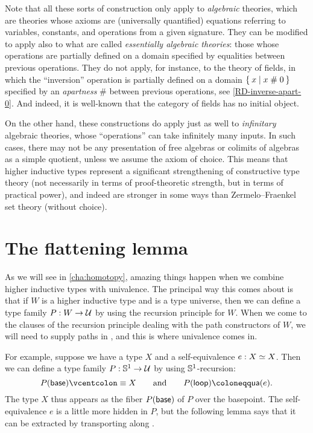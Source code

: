 \mentalpause

Note that all these sorts of construction only apply to \emph{algebraic} theories, which are theories whose axioms are (universally quantified) equations referring to variables, constants, and operations from a given signature.
They can be modified to apply also to what are called \emph{essentially algebraic theories}: those whose operations are partially defined on a domain specified by equalities between previous operations.
They do not apply, for instance, to the theory of fields, in which the ``inversion'' operation is partially defined on a domain $\Set{x | x \mathrel{\#} 0}$ specified by an \emph{apartness} $\#$ between previous operations, see \autoref{RD-inverse-apart-0}.
And indeed, it is well-known that the category of fields has no initial object.
%

On the other hand, these constructions do apply just as well to \emph{infinitary} algebraic theories, whose ``operations'' can take infinitely many inputs.
In such cases, there may not be any presentation of free algebras or colimits of algebras as a simple quotient, unless we assume the axiom of choice.
This means that higher inductive types represent a significant strengthening of constructive type theory (not necessarily in terms of proof-theoretic strength, but in terms of practical power), and indeed are stronger in some ways than Zermelo--Fraenkel set theory (without choice).


\section{The flattening lemma}
\label{sec:flattening}

As we will see in \autoref{cha:homotopy}, amazing things happen when we combine higher inductive types with univalence.
The principal way this comes about is that if $W$ is a higher inductive type and \UU is a type universe, then we can define a type family $P:W\to \mathcal{U}$ by using the recursion principle for $W$.
When we come to the clauses of the recursion principle dealing with the path constructors of $W$, we will need to supply paths in \UU, and this is where univalence comes in.

For example, suppose we have a type $X$ and a self-equivalence $e:X \simeq X$.
Then we can define a type family $P:\mathbb{S}^1 \to \mathcal{U}$ by using $\mathbb{S}^1$-recursion:
\begin{equation*}
  P(\base) \defeq X
  \qquad\text{and}\qquad
  \ap P\lloop \defid \ua(e).
\end{equation*}
The type $X$ thus appears as the fiber $P(\mathsf{base})$ of $P$ over the basepoint.
The self-equivalence $e$ is a little more hidden in $P$, but the following lemma says that it can be extracted by transporting along \lloop.

